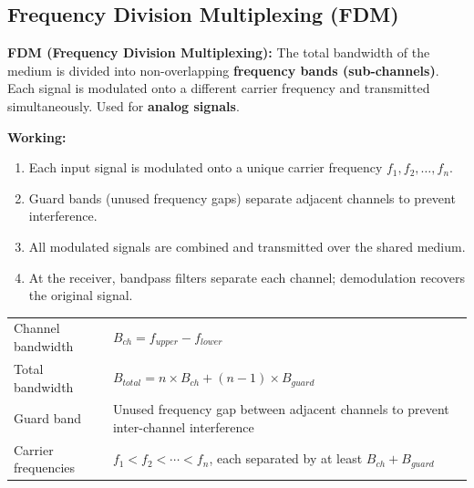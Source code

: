 \documentclass[12pt,a4paper]{article}
\begin{document}
\subsection{Frequency Division Multiplexing (FDM)}

\begin{tcolorbox}[defbox]
\textbf{FDM (Frequency Division Multiplexing):} The total bandwidth of the medium is divided into non-overlapping \textbf{frequency bands (sub-channels)}. Each signal is modulated onto a different carrier frequency and transmitted simultaneously. Used for \textbf{analog signals}.
\end{tcolorbox}

\textbf{Working:}
\begin{enumerate}[label=\textbf{\arabic*.}, leftmargin=*, itemsep=3pt]
  \item Each input signal is modulated onto a unique carrier frequency $f_1, f_2, \ldots, f_n$.
  \item Guard bands (unused frequency gaps) separate adjacent channels to prevent interference.
  \item All modulated signals are combined and transmitted over the shared medium.
  \item At the receiver, bandpass filters separate each channel; demodulation recovers the original signal.
\end{enumerate}

\begin{tcolorbox}[formulabox, title={\textbf{FDM Key Formulas}}]
\begin{tabularx}{\linewidth}{B{4.5cm} X}
Channel bandwidth    & $B_{ch} = f_{upper} - f_{lower}$ \\[4pt]
Total bandwidth      & $B_{total} = n \times B_{ch} + (n-1) \times B_{guard}$ \\[4pt]
Guard band           & Unused frequency gap between adjacent channels to prevent inter-channel interference \\[4pt]
Carrier frequencies  & $f_1 < f_2 < \cdots < f_n$, each separated by at least $B_{ch} + B_{guard}$
\end{tabularx}
\end{tcolorbox}
\end{document}

